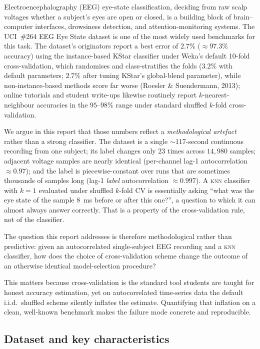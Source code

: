 \documentclass[11pt]{article}
\newcommand{\knn}{\textsc{knn}}
\begin{document}
Electroencephalography (EEG) eye-state classification, deciding from raw
scalp voltages whether a subject's eyes are open or closed, is a building
block of brain--computer interfaces, drowsiness detection, and
attention-monitoring systems. The UCI~\#264 EEG Eye State dataset is one
of the most widely used benchmarks for this task. The dataset's originators
report a best error of $2.7\%$ ($\approx 97.3\%$ accuracy) using the
instance-based KStar classifier under Weka's default 10-fold
cross-validation, which randomises and class-stratifies the folds ($3.2\%$
with default parameters; $2.7\%$ after tuning KStar's global-blend
parameter), while non-instance-based methods score far worse (Roesler
\& Suendermann, 2013); online tutorials and student write-ups likewise
routinely report $k$-nearest-neighbour accuracies in the $95$--$98\%$ range
under standard shuffled $k$-fold cross-validation.

We argue in this report that those numbers reflect a \emph{methodological
artefact} rather than a strong classifier. The dataset is a single
$\sim$117-second continuous recording from one subject; its label changes
only $23$ times across $14{,}980$ samples; adjacent voltage samples are
nearly identical (per-channel lag-1 autocorrelation $\approx 0.97$); and the
label is piecewise-constant over runs that are sometimes thousands of
samples long (lag-1 \emph{label} autocorrelation $\approx 0.997$).
A \knn{} classifier with $k=1$ evaluated under shuffled $k$-fold CV is
essentially asking ``what was the eye state of the sample $8$~ms before or
after this one?'', a question to which it can almost always answer
correctly. That is a property of the cross-validation rule, not of the
classifier.

The question this report addresses is therefore methodological rather than
predictive: given an autocorrelated single-subject EEG recording and a
\knn{} classifier, how does the choice of cross-validation scheme change the
outcome of an otherwise identical model-selection procedure?

This matters because cross-validation is the standard tool students are
taught for honest accuracy estimation, yet on autocorrelated time-series
data the default i.i.d.\ shuffled scheme silently inflates the estimate.
Quantifying that inflation on a clean, well-known benchmark makes the
failure mode concrete and reproducible.

\subsection{Dataset and key characteristics}
\end{document}
